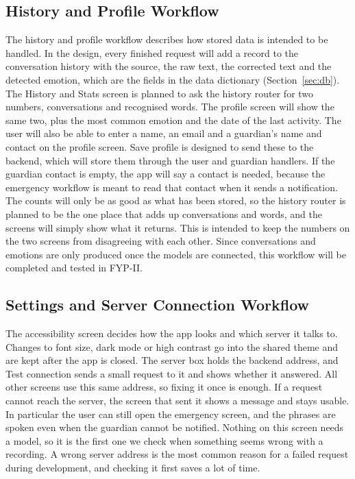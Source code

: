 \documentclass{FastFyp}
\begin{document}
\subsection{History and Profile Workflow}
The history and profile workflow describes how stored data is intended to be handled. In the design, every finished request will add a record to the conversation history with the source, the raw text, the corrected text and the detected emotion, which are the fields in the data dictionary (Section~\ref{sec:db}). The History and Stats screen is planned to ask the history router for two numbers, conversations and recognised words. The profile screen will show the same two, plus the most common emotion and the date of the last activity. The user will also be able to enter a name, an email and a guardian's name and contact on the profile screen. Save profile is designed to send these to the backend, which will store them through the user and guardian handlers. If the guardian contact is empty, the app will say a contact is needed, because the emergency workflow is meant to read that contact when it sends a notification. The counts will only be as good as what has been stored, so the history router is planned to be the one place that adds up conversations and words, and the screens will simply show what it returns. This is intended to keep the numbers on the two screens from disagreeing with each other. Since conversations and emotions are only produced once the models are connected, this workflow will be completed and tested in FYP-II.

\subsection{Settings and Server Connection Workflow}
The accessibility screen decides how the app looks and which server it talks to. Changes to font size, dark mode or high contrast go into the shared theme and are kept after the app is closed. The server box holds the backend address, and Test connection sends a small request to it and shows whether it answered. All other screens use this same address, so fixing it once is enough. If a request cannot reach the server, the screen that sent it shows a message and stays usable. In particular the user can still open the emergency screen, and the phrases are spoken even when the guardian cannot be notified. Nothing on this screen needs a model, so it is the first one we check when something seems wrong with a recording. A wrong server address is the most common reason for a failed request during development, and checking it first saves a lot of time.
\end{document}
